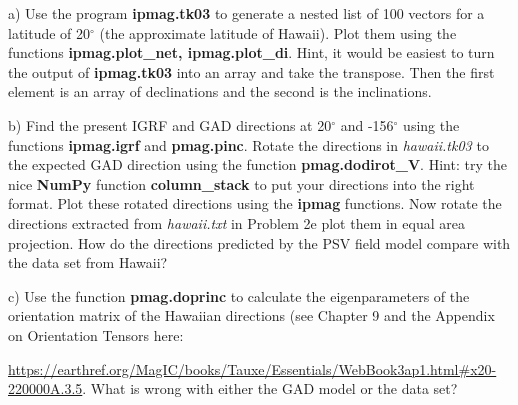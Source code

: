 {a) Use the program {\bf ipmag.tk03} to generate a nested list  of 100 vectors for a latitude of 20$^{\circ}$ (the approximate latitude of Hawaii). Plot them using the functions {\bf ipmag.plot\_net, ipmag.plot\_di}.  Hint, it would be easiest to turn the output  of   {\bf ipmag.tk03} into an array and take the transpose. Then the first element is an array of declinations and the second is the inclinations.  

b)  Find the present IGRF and GAD directions at 20$^{\circ}$ and -156$^{\circ}$ using the functions {\bf  ipmag.igrf} and {\bf pmag.pinc}.    Rotate the directions in {\it hawaii.tk03}  to the expected GAD direction using the function {\bf pmag.dodirot\_V}.   Hint: try the nice {\bf NumPy} function {\bf column\_stack} to put your directions into the right format.  
Plot these rotated directions using  the {\bf ipmag} functions.  Now rotate the directions extracted from {\it hawaii.txt} in Problem 2e plot them in equal area projection.  How do the directions predicted by the PSV field model compare with the data set from Hawaii?  

c) Use the function {\bf pmag.doprinc} to calculate the eigenparameters of the orientation matrix of the Hawaiian directions (see Chapter 9 and %
the Appendix on Orientation Tensors here: 

 {\url{https://earthref.org/MagIC/books/Tauxe/Essentials/WebBook3ap1.html#x20-220000A.3.5}}.   What is wrong with either the GAD model or the data set?  

}





